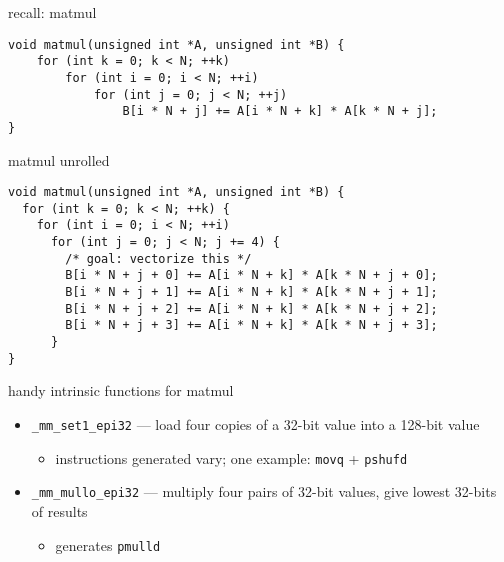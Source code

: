 
\begin{frame}[fragile,label=sqSerial]{recall: matmul}
\lstset{language=C,style=small}
\begin{lstlisting}
void matmul(unsigned int *A, unsigned int *B) {
    for (int k = 0; k < N; ++k)
        for (int i = 0; i < N; ++i)
            for (int j = 0; j < N; ++j)
                B[i * N + j] += A[i * N + k] * A[k * N + j];
}
\end{lstlisting}
\end{frame}

\begin{frame}[fragile,label=sqSerialUnrolled]{matmul unrolled}
\lstset{language=C,style=smaller}
\begin{lstlisting}
void matmul(unsigned int *A, unsigned int *B) {
  for (int k = 0; k < N; ++k) {
    for (int i = 0; i < N; ++i)
      for (int j = 0; j < N; j += 4) {
        /* goal: vectorize this */
        B[i * N + j + 0] += A[i * N + k] * A[k * N + j + 0];
        B[i * N + j + 1] += A[i * N + k] * A[k * N + j + 1];
        B[i * N + j + 2] += A[i * N + k] * A[k * N + j + 2];
        B[i * N + j + 3] += A[i * N + k] * A[k * N + j + 3];
      }
}
\end{lstlisting}
\end{frame}

\begin{frame}[fragile,label=sqVectInstr]{handy intrinsic functions for matmul}
    \begin{itemize}
        \item {\tt \_mm\_set1\_epi32} --- load four copies of a 32-bit value into a 128-bit value
            \begin{itemize}
            \item instructions generated vary; one example: {\tt movq} + {\tt pshufd}
            \end{itemize}
        \item {\tt \_mm\_mullo\_epi32} --- multiply four pairs of 32-bit values, give lowest 32-bits of results
            \begin{itemize}
            \item generates {\tt pmulld}
            \end{itemize}
    \end{itemize}
\end{frame}


